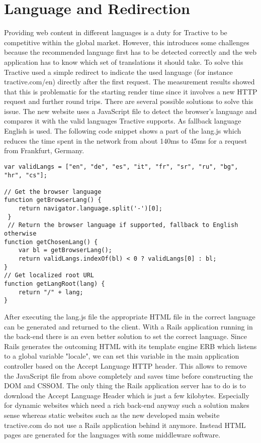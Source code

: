 \section{Language and Redirection}

Providing web content in different languages is a duty for Tractive to be competitive within the global market. However, this introduces some challenges because the recommended language first has to be detected correctly and the web application has to know which set of translations it should take. To solve this Tractive used a simple redirect to indicate the used language (for instance tractive.com/en) directly after the first request. The measurement results showed that this is problematic for the starting render time since it involves a new HTTP request and further round trips. There are several possible solutions to solve this issue. The new website uses a JavaScript file to detect the browser's language and compares it with the valid languages Tractive supports. As fallback language English is used. The following code snippet shows a part of the lang.js which reduces the time spent in the network from about 140ms to 45ms for a request from Frankfurt, Germany.

\begin{lstlisting}[caption=Code snippet of lang.js]
var validLangs = ["en", "de", "es", "it", "fr", "sr", "ru", "bg", "hr", "cs"];

// Get the browser language
function getBrowserLang() {
    return navigator.language.split('-')[0];
 }
 // Return the browser language if supported, fallback to English otherwise
function getChosenLang() {
    var bl = getBrowserLang();
    return validLangs.indexOf(bl) < 0 ? validLangs[0] : bl;
}
// Get localized root URL
function getLangRoot(lang) {
    return "/" + lang;
}
\end{lstlisting} 

After executing the lang.js file the appropriate HTML file in the correct language can be generated and returned to the client. With a Rails application running in the back-end there is an even better solution to set the correct language. Since Rails generates the outcoming HTML with its template engine ERB which listens to a global variable "locale", we can set this variable in the main application controller based on the Accept Language HTTP header. This allows to remove the JavaScript file from above completely and saves time before constructing the DOM and CSSOM. The only thing the Rails application server has to do is to download the Accept Language Header which is just a few kilobytes. Especially for dynamic websites which need a rich back-end anyway such a solution makes sense whereas static websites such as the new developed main website tractive.com do not use a Rails application behind it anymore. Instead HTML pages are generated for the languages with some middleware software.
